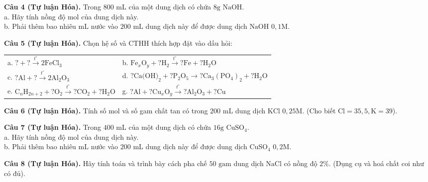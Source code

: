 \documentclass{article}
\begin{document}
\fontsize{25}{33}\selectfont
\textbf{Câu 4 (Tự luận Hóa).} Trong $800\text{ mL}$ của một dung dịch có chứa $8\text{g } \text{NaOH}$.\\
a. Hãy tính nồng độ mol của dung dịch này.\\
b. Phải thêm bao nhiêu $\text{mL}$ nước vào $200\text{ mL}$ dung dịch này để được dung dịch $\text{NaOH}$ $0,1\text{M}$.
\vspace*{\fill}
\newpage

\fontsize{25}{33}\selectfont
\textbf{Câu 5 (Tự luận Hóa).} Chọn hệ số và CTHH thích hợp đặt vào dấu hỏi:\\
\begin{tabularx}{\linewidth}{@{}X X@{}}
a. $? + ? \xrightarrow{t^\circ} 2\text{FeCl}_3$ & b. $\text{Fe}_x\text{O}_y + ?\text{H}_2 \xrightarrow{t^\circ} ?\text{Fe} + ?\text{H}_2\text{O}$\\[8pt]
c. $?\text{Al} + ? \xrightarrow{t^\circ} 2\text{Al}_2\text{O}_3$ & d. $?\text{Ca(OH)}_2 + ?\text{P}_2\text{O}_5 \to ?\text{Ca}_3(\text{PO}_4)_2 + ?\text{H}_2\text{O}$\\[8pt]
e. $\text{C}_n\text{H}_{2n+2} + ?\text{O}_2 \xrightarrow{t^\circ} ?\text{CO}_2 + ?\text{H}_2\text{O}$ & g. $?\text{Al} + ?\text{Cu}_x\text{O}_y \xrightarrow{t^\circ} ?\text{Al}_2\text{O}_3 + ?\text{Cu}$
\end{tabularx}
\vspace*{\fill}
\newpage

\fontsize{26}{34}\selectfont
\textbf{Câu 6 (Tự luận Hóa).} Tính số mol và số gam chất tan có trong $200\text{ mL}$ dung dịch $\text{KCl}$ $0,25\text{M}$. (Cho biết $\text{Cl} = 35,5, \text{K} = 39$).
\vspace*{\fill}
\newpage

\fontsize{25}{33}\selectfont
\textbf{Câu 7 (Tự luận Hóa).} Trong $400\text{ mL}$ của một dung dịch có chứa $16\text{g } \text{CuSO}_4$.\\
a. Hãy tính nồng độ mol của dung dịch này.\\
b. Phải thêm bao nhiêu $\text{mL}$ nước vào $200\text{ mL}$ dung dịch này để được dung dịch $\text{CuSO}_4$ $0,2\text{M}$.
\vspace*{\fill}
\newpage

\fontsize{25}{33}\selectfont
\textbf{Câu 8 (Tự luận Hóa).} Hãy tính toán và trình bày cách pha chế $50\text{ gam}$ dung dịch $\text{NaCl}$ có nồng độ $2\%$. (Dụng cụ và hoá chất coi như có đủ).
\vspace*{\fill}
\newpage
\end{document}
